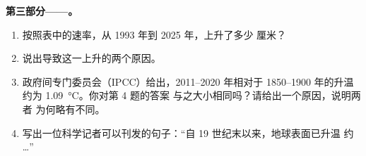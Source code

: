 \begin{problem}
\noindent\textbf{第三部分——。}\par\nopagebreak
\begin{enumerate}[resume, beginpenalty=10000]
  \item 按照表中的速率，从 1993 年到 2025 年，上升了多少
        厘米？
  \item 说出导致这一上升的两个原因。
  \item 政府间专门委员会（IPCC）给出，2011--2020 年相对于 1850--1900 年的升温
        约为 \qty{1.09}{\degreeCelsius}。你对第 4 题的答案
        与之大小相同吗？请给出一个原因，说明两者
        为何略有不同。
  \item 写出一位科学记者可以刊发的句子：“自
        19 世纪末以来，地球表面已升温
        约 \ldots”
\end{enumerate}
\end{problem}
